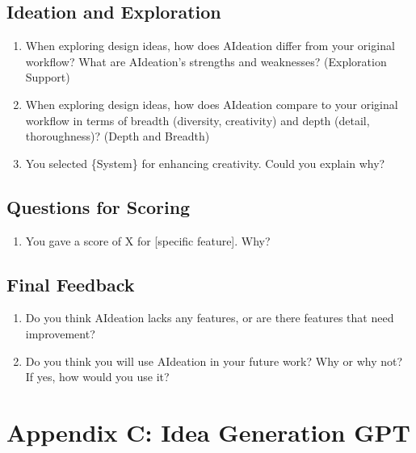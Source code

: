 \subsection*{Ideation and Exploration}
\begin{enumerate}[label=\textbf{\arabic*.}]
    \item When exploring design ideas, how does AIdeation differ from your original workflow? What are AIdeation's strengths and weaknesses? (Exploration Support)
    \item When exploring design ideas, how does AIdeation compare to your original workflow in terms of breadth (diversity, creativity) and depth (detail, thoroughness)? (Depth and Breadth)
    \item You selected \{System\} for enhancing creativity. Could you explain why?
\end{enumerate}

\subsection*{Questions for Scoring}
\begin{enumerate}[label=\textbf{\arabic*.}]
    \item You gave a score of X for [specific feature]. Why?
\end{enumerate}

\subsection*{Final Feedback}
\begin{enumerate}[label=\textbf{\arabic*.}]
    \item Do you think AIdeation lacks any features, or are there features that need improvement?
    \item Do you think you will use AIdeation in your future work? Why or why not? If yes, how would you use it? 
\end{enumerate}



\section{Appendix C: Idea Generation GPT}
\label{AppendixC}

